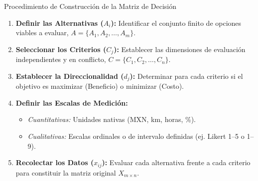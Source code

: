 \documentclass[aspectratio=169, 10pt]{beamer}
\begin{document}
\begin{frame}{Procedimiento de Construcción de la Matriz de Decisión}
    \begin{enumerate}
        \small
        \item \textbf{Definir las Alternativas ($A_i$):} Identificar el conjunto finito de opciones viables a evaluar, $A = \{A_1, A_2, \dots, A_m\}$.
        \item \textbf{Seleccionar los Criterios ($C_j$):} Establecer las dimensiones de evaluación independientes y en conflicto, $C = \{C_1, C_2, \dots, C_n\}$.
        \item \textbf{Establecer la Direccionalidad ($d_j$):} Determinar para cada criterio si el objetivo es maximizar (Beneficio) o minimizar (Costo).
        \item \textbf{Definir las Escalas de Medición:}
            \begin{itemize}
                \scriptsize
                \item \textit{Cuantitativas:} Unidades nativas (MXN, km, horas, \%).
                \item \textit{Cualitativas:} Escalas ordinales o de intervalo definidas (ej. Likert 1--5 o 1--9).
            \end{itemize}
        \item \textbf{Recolectar los Datos ($x_{ij}$):} Evaluar cada alternativa frente a cada criterio para constituir la matriz original $X_{m \times n}$.
    \end{enumerate}
\end{frame}
\end{document}

